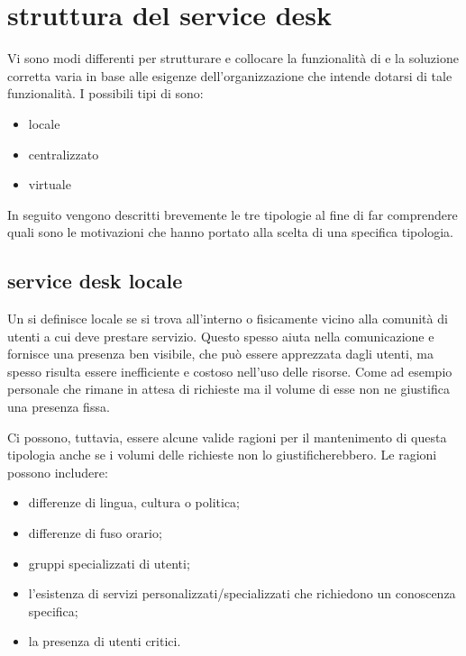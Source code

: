 %
%
\section[Struttura del Service Desk]{struttura del service desk}
\label{sd-structure}
Vi sono modi differenti per strutturare e collocare la funzionalità di  e la soluzione corretta varia in base alle esigenze dell'organizzazione che intende dotarsi di tale funzionalità. I possibili tipi di  sono:

\begin{itemize}
\item{locale}
\item{centralizzato}
\item{virtuale}
\end{itemize}

In seguito vengono descritti brevemente le tre tipologie al fine di far comprendere quali sono le motivazioni che hanno portato alla scelta di una specifica tipologia.

\subsection[Service Desk Locale]{service desk locale}
\label{sd-local-sd}
Un  si definisce locale se si trova all'interno o fisicamente vicino alla comunità di utenti a cui deve prestare servizio. Questo spesso aiuta nella comunicazione e fornisce una presenza ben visibile, che può essere apprezzata dagli utenti, ma spesso risulta essere inefficiente e costoso nell'uso delle risorse. Come ad esempio personale che rimane in attesa di richieste ma il volume di esse non ne giustifica una presenza fissa.

Ci possono, tuttavia, essere alcune valide ragioni per il mantenimento di questa tipologia anche se i volumi delle richieste non lo giustificherebbero. Le ragioni possono includere:

\begin{itemize}
\item{differenze di lingua, cultura o politica;}
\item{differenze di fuso orario;}
\item{gruppi specializzati di utenti;}
\item{l'esistenza di servizi personalizzati/specializzati che richiedono un conoscenza specifica;}
\item{la presenza di utenti critici.}
\end{itemize}

